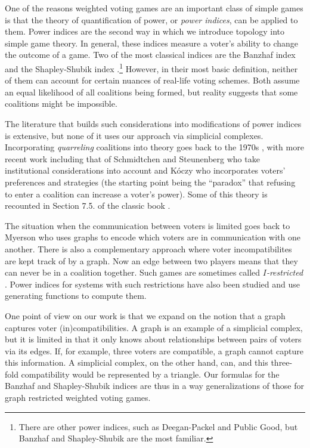 \documentclass[11pt]{amsart}
\theoremstyle{plain}
\theoremstyle{definition}
\theoremstyle{remark}
\begin{document}
One of the reasons weighted voting games are an important class of simple games is that the theory of quantification of power, or \emph{power indices}, can be applied to them. Power indices are the second way in which we introduce topology into simple game theory. In general, these indices measure a voter's ability to change the outcome of a game. Two of the most classical indices are the Banzhaf index \cite{Ban65} and the Shapley-Shubik index \cite{ShSh54}.\footnote{There are other power indices, such as Deegan-Packel and Public Good, but Banzhaf and Shapley-Shubik are the most familiar.} However, in their most basic definition, neither of them can account for certain nuances of real-life voting schemes. Both assume an equal likelihood of all coalitions being formed, but reality suggests that some coalitions might be impossible. 

The literature that builds such considerations into modifications of power indices is extensive, but none of it uses our approach via simplicial complexes. Incorporating \emph{quarreling} coalitions into theory goes back to the 1970s \cite{K:Quarreling}, with more recent work including that of Schmidtchen and Steunenberg \cite{SS:PreferencePower} who take institutional considerations into account and K\'oczy \cite{K:QuarrelingPower} who incorporates voters' preferences and strategies (the starting point being the ``paradox'' that refusing to enter a coalition can increase a voter's power). Some of this theory is recounted in Section 7.5. of the classic book \cite{FM:VotingPower}.


The situation when the communication between voters is limited goes back to Myerson \cite{M:GraphsCooperation} who uses graphs to encode which voters are in communication with one another. There is also a complementary approach where voter incompatibilites are kept track of by a graph. Now an edge between two players means that they can never be in a coalition together. Such games are sometimes called \emph{$I$-restricted} \cite{carreras:1991, bergatinos:1993, yakuba:2008}. Power indices for systems with such restrictions have also been studied \cite{am:2015} and use generating functions to compute them. 

One point of view on our work is that we expand on the notion that a graph captures voter (in)compatibilities. A graph is an example of a simplicial complex, but it is limited in that it only knows about relationships between pairs of voters via its edges. If, for example, three voters are compatible, a graph cannot capture this information. A simplicial complex, on the other hand, can, and this three-fold compatibility would be represented by a triangle. Our formulas for the Banzhaf and Shapley-Shubik indices are thus in a way generalizations of those for graph restricted weighted voting games.
\end{document}
